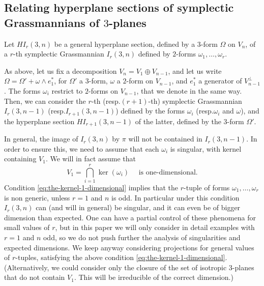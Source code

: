 \documentclass[11pt]{article}
\newcommand{\resp}{resp.\xspace}
\newcommand{\Subsection}{\subsection}
\theoremstyle{plain}
\theoremstyle{definition}
\begin{document}
\Subsection{Relating hyperplane sections of symplectic Grassmannians of $3$-planes}
Let $HI_r(3,n)$ be a general hyperplane
section, defined by a 3-form $\Omega$ on $V_n$, of a $r$-th symplectic Grassmannian $I_r(3,n)$ defined by $2$-forms $\omega_1,\ldots,\omega_r$.

As above, let us fix a decomposition $V_n=V_1 \oplus V_{n-1}$, and let us write
$\Omega = \Omega' + \omega \wedge e_1^*$, for $\Omega'$ a $3$-form, $\omega$ a $2$-form on $V_{n-1}$, and $e_1^*$ a generator of $V_{n-1}^\perp$.
The forms $\omega_i$ restrict to $2$-forms on $V_{n-1}$, that we denote in the same way.
Then, we can consider the $r$-th (\resp $(r+1)$-th) symplectic Grassmannian $I_r(3,n-1)$ (\resp $I_{r+1}(3,n-1)$) defined by the forms $\omega_i$ (\resp $\omega_i$ and $\omega$), and the hyperplane section $HI_{r+1}(3,n-1)$ of the latter, defined by the $3$-form $\Omega'$.

In general, the image of $I_r(3,n)$ by $\pi$ will not be contained in $I_r(3,n-1)$. In order
to ensure this, we need to assume that each $\omega_i$ is singular, with kernel containing $V_1$.
We will in fact assume that
\begin{equation}\label{eq:the-kernel-1-dimensional}
V_1 = \bigcap_{i=1}^r \ker(\omega_i) \quad \text{ is one-dimensional.}
\end{equation}
Condition \eqref{eq:the-kernel-1-dimensional} implies that the $r$-tuple of
forms $\omega_1,\ldots ,\omega_r$ is non generic,
unless $r=1$ and $n$ is odd.
In particular under this condition $I_r(3,n)$ can (and will in general) be singular,
and it can even be of bigger dimension than expected. One can have a
partial control of these phenomena for small values of $r$, but in this paper we will only
consider in detail examples with $r=1$ and $n$ odd, so we do not push further the analysis of singularities and expected dimensions. We keep anyway considering projections for general values of $r$-tuples,
satisfying the above condition \eqref{eq:the-kernel-1-dimensional}.
(Alternatively, we could consider only the closure of the set of isotropic
$3$-planes that do not contain $V_1$. This will be irreducible of the correct dimension.)
\end{document}
